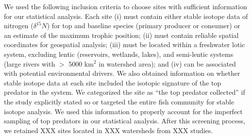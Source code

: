 \documentclass[11pt, class=article, crop=false]{standalone}
\begin{document}
We used the following inclusion criteria to choose sites with sufficient information for our statistical analysis.
Each site (i) must contain either stable isotope data of nitrogen ($\delta^{15}N$) for top and baseline species (primary producer or consumer) or an estimate of the maximum trophic position; 
(ii) must contain reliable spatial coordinates for geospatial analysis; 
(iii) must be located within a freshwater lotic system, excluding lentic (reservoirs, wetlands, lakes), and semi-lentic systems (large rivers with $>$ 5000 km$^2$ in watershed area); and (iv) can be associated with potential environmental drivers.
We also obtained information on whether stable isotope data at each site included the isotopic signature of the top predator in the system.
We categorized the site as ``the top predator collected'' if the study explicitly stated so or targeted the entire fish community for stable isotope analysis.
We used this information to properly account for the imperfect sampling of top predators in our statistical analysis.
After this screening process, we retained XXX sites located in XXX watersheds from XXX studies. 
\end{document}
